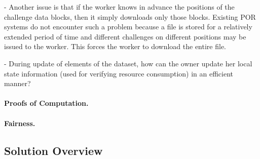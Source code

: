 - Another issue is that if the worker knows in advance the positions of the challenge data blocks, then it simply downloads only those blocks. Existing POR systems do not encounter such a problem because a file is stored for a relatively extended period of time and different challenges on different positions may be issued to the worker. This forces the worker to download the entire file.

- During update of elements of the dataset, how can the owner update her local state information (used for verifying resource consumption) in an efficient manner?

\paragraph{Proofs of Computation.}


\paragraph{Fairness.}



\subsection{Solution Overview} \label{sect:solution}

